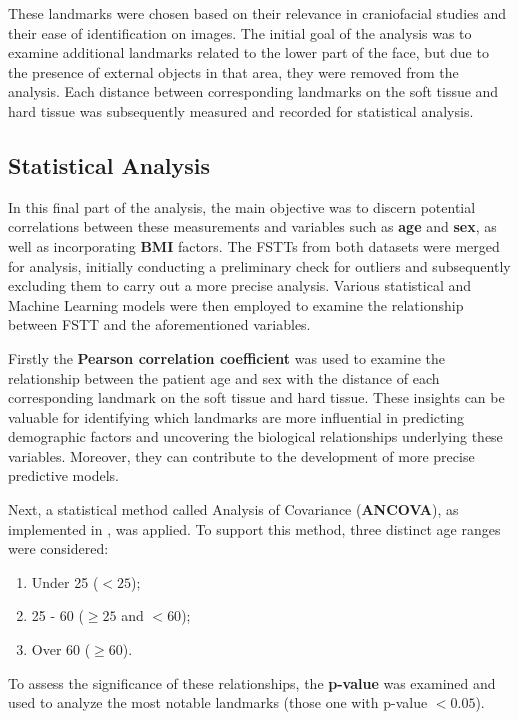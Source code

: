 \documentclass[journal,article,submit,pdftex,moreauthors]{Definitions/mdpi}
\begin{document}
\noindent These landmarks were chosen based on their relevance in craniofacial studies and their ease of identification on images. The initial goal of the analysis was to examine additional landmarks related to the lower part of the face, but due to the presence of external objects in that area, they were removed from the analysis. Each distance between corresponding landmarks on the soft tissue and hard tissue was subsequently measured and recorded for statistical analysis.

\subsection{Statistical Analysis}
\label{sec:sez2-5}

In this final part of the analysis, the main objective was to discern potential correlations between these measurements and variables such as \textbf{age} and \textbf{sex}, as well as incorporating \textbf{BMI} factors. The FSTTs from both datasets were merged for analysis, initially conducting a preliminary check for outliers and subsequently excluding them to carry out a more precise analysis. Various statistical and Machine Learning models were then employed to examine the relationship between FSTT and the aforementioned variables.

Firstly the \textbf{Pearson correlation coefficient} was used to examine the relationship between the patient age and sex with the distance of each corresponding landmark on the soft tissue and hard tissue. These insights can be valuable for identifying which landmarks are more influential in predicting demographic factors and uncovering the biological relationships underlying these variables. Moreover, they can contribute to the development of more precise predictive models.

Next, a statistical method called Analysis of Covariance (\textbf{ANCOVA}), as implemented in \cite{ref19}, was applied. To support this method, three distinct age ranges were considered:
\begin{enumerate}
    \item Under 25 ($< 25$);
    \item 25 - 60 ($\geq 25$ and $< 60$);
    \item Over 60 ($\geq 60$).
\end{enumerate}
To assess the significance of these relationships, the \textbf{p-value} was examined and used to analyze the most notable landmarks (those one with p-value $< 0.05$).
\end{document}

